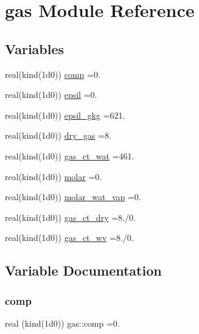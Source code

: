 \hypertarget{namespacegas}{}\section{gas Module Reference}
\label{namespacegas}
\subsection*{Variables}
\begin{DoxyCompactItemize}
\item 
real(kind(1d0)) \hyperlink{namespacegas_a8d2291490d8d94a5eb49100ffd378b26}{comp} =0.
\item 
real(kind(1d0)) \hyperlink{namespacegas_afa96177c3b1c55a70edf05810d52f9f0}{epsil} =0.
\item 
real(kind(1d0)) \hyperlink{namespacegas_adba3767a875b8f50cfbb3e846eecb0fa}{epsil\+\_\+gkg} =621.
\item 
real(kind(1d0)) \hyperlink{namespacegas_a380e25a8b858b684637ee899e03d39fe}{dry\+\_\+gas} =8.
\item 
real(kind(1d0)) \hyperlink{namespacegas_a5d7564fea612b3867805c157aff8acae}{gas\+\_\+ct\+\_\+wat} =461.
\item 
real(kind(1d0)) \hyperlink{namespacegas_a32b7a8a8aa0b674522c67d4cec42218f}{molar} =0.
\item 
real(kind(1d0)) \hyperlink{namespacegas_ad10ab34d9d4d2e261f87f013d3822774}{molar\+\_\+wat\+\_\+vap} =0.
\item 
real(kind(1d0)) \hyperlink{namespacegas_ac0aae13e9168fcb9f0f09f3559594b4d}{gas\+\_\+ct\+\_\+dry} =8./0.
\item 
real(kind(1d0)) \hyperlink{namespacegas_af2886584ed51b7aeb801840825049d91}{gas\+\_\+ct\+\_\+wv} =8./0.
\end{DoxyCompactItemize}


\subsection{Variable Documentation}
\mbox{\label{namespacegas_a8d2291490d8d94a5eb49100ffd378b26}} 
\subsubsection{\texorpdfstring{comp}{comp}}
{\footnotesize\ttfamily real (kind(1d0)) gas\+::comp =0.}



